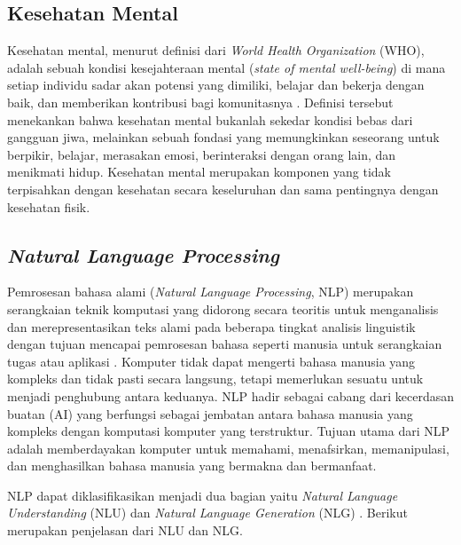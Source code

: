 \subsection{Kesehatan Mental}
Kesehatan mental, menurut definisi dari \textit{World Health Organization} (WHO), adalah sebuah kondisi kesejahteraan mental (\textit{state of mental well-being})
di mana setiap individu sadar akan potensi yang dimiliki, belajar dan bekerja dengan baik, dan memberikan kontribusi bagi komunitasnya \cite{WHO2022MentalHealth}.
Definisi tersebut menekankan bahwa kesehatan mental bukanlah sekedar kondisi bebas dari gangguan jiwa, melainkan sebuah fondasi yang memungkinkan seseorang untuk berpikir, belajar, merasakan emosi, berinteraksi dengan orang lain, dan menikmati hidup.
Kesehatan mental merupakan komponen yang tidak terpisahkan dengan kesehatan secara keseluruhan dan sama pentingnya dengan kesehatan fisik.

\subsection{\textit{Natural Language Processing}}
Pemrosesan bahasa alami (\textit{Natural Language Processing}, NLP) merupakan serangkaian teknik komputasi yang didorong secara teoritis untuk menganalisis dan merepresentasikan
teks alami pada beberapa tingkat analisis linguistik dengan tujuan mencapai pemrosesan bahasa seperti manusia untuk serangkaian tugas atau aplikasi \cite{Liddy2001NLP}.
Komputer tidak dapat mengerti bahasa manusia yang kompleks dan tidak pasti secara langsung, tetapi memerlukan sesuatu untuk menjadi penghubung antara keduanya.
NLP hadir sebagai cabang dari kecerdasan buatan (AI) yang berfungsi sebagai jembatan antara bahasa manusia yang kompleks dengan komputasi komputer yang terstruktur.
Tujuan utama dari NLP adalah memberdayakan komputer untuk memahami, menafsirkan, memanipulasi, dan menghasilkan bahasa manusia yang bermakna dan bermanfaat.

NLP dapat diklasifikasikan menjadi dua bagian yaitu \textit{Natural Language Understanding} (NLU) dan \textit{Natural Language Generation} (NLG) \cite{Khurana2022AboutNLP}.
Berikut merupakan penjelasan dari NLU dan NLG.

